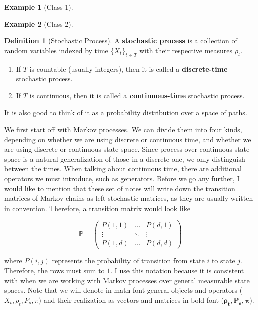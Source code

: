 \documentclass{article}
\theoremstyle{definition}
\newtheorem{example}{Example}[section]
\theoremstyle{remark}
\theoremstyle{definition}
\newtheorem{definition}{Definition}[section]
\begin{document}
  \begin{example}[Class 1] 
    
  \end{example}

  \begin{example}[Class 2]
    
  \end{example}

  \begin{definition}[Stochastic Process]
    A \textbf{stochastic process} is a collection of random variables indexed by time $\{X_t\}_{t \in T}$ with their respective measures $\rho_t$. 

    \begin{enumerate}
      \item If $T$ is countable (usually integers), then it is called a \textbf{discrete-time} stochastic process. 
      \item If $T$ is continuous, then it is called a \textbf{continuous-time} stochastic process. 
    \end{enumerate}

    It is also good to think of it as a probability distribution over a space of paths. 
  \end{definition}

  We first start off with Markov processes. We can divide them into four kinds, depending on whether we are using discrete or continuous time, and whether we are using discrete or continuous state space. Since process over continuous state space is a natural generalization of those in a discrete one, we only distinguish between the times. When talking about continuous time, there are additional operators we must introduce, such as generators. Before we go any further, I would like to mention that these set of notes will write down the transition matrices of Markov chains as left-stochastic matrices, as they are usually written in convention. Therefore, a transition matrix would look like 

    \[\mathbb{P} = \begin{pmatrix} P(1, 1) & \ldots & P(d, 1) \\ \vdots & \ddots & \vdots \\ P(1, d) & \ldots & P(d, d) \end{pmatrix} \]

  where $P(i, j)$ represents the probability of transition from state $i$ to state $j$. Therefore, the rows must sum to $1$. I use this notation because it is consistent with when we are working with Markov processes over general measurable state spaces. Note that we will denote in math font general objects and operators ($X_t, \rho_t, P_s, \pi$) and their realization as vectors and matrices in bold font ($\boldsymbol{\rho_t}, \mathbf{P_s}, \boldsymbol{\pi}$). 
\end{document}

